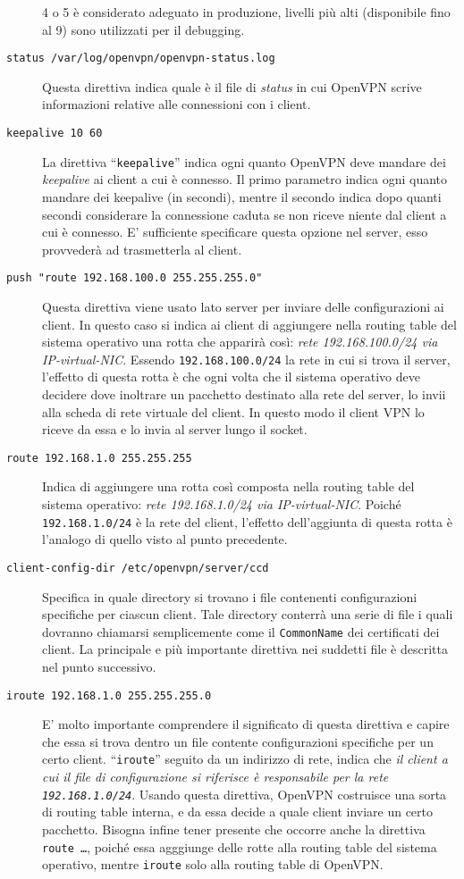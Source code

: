 \begin{description}
  4 o 5 è considerato adeguato in produzione, livelli più alti (disponibile fino al 9)
  sono utilizzati per il debugging.
  \item[\texttt{status /var/log/openvpn/openvpn-status.log}]Questa direttiva indica
  quale è il file di \textit{status} in cui OpenVPN scrive informazioni relative
  alle connessioni con i client.
  \item[\texttt{keepalive 10 60}]La direttiva ``\texttt{keepalive}'' indica ogni
  quanto OpenVPN deve mandare dei \textit{keepalive} ai client a cui è connesso.
  Il primo parametro indica ogni quanto mandare dei keepalive (in secondi), mentre
  il secondo indica dopo quanti secondi considerare la connessione caduta se non riceve
  niente dal client a cui è connesso. E' sufficiente specificare questa opzione
  nel server, esso provvederà ad trasmetterla al client.
  \item[\texttt{push "route 192.168.100.0 255.255.255.0"}]Questa direttiva viene
  usato lato server per inviare delle configurazioni ai client. In questo caso si indica
  ai client di aggiungere nella routing table del sistema operativo una rotta che
  apparirà così: \textit{rete 192.168.100.0/24 via IP-virtual-NIC}. Essendo
  \texttt{192.168.100.0/24} la rete in cui si trova il server, l'effetto di questa
  rotta è che ogni volta che il sistema operativo deve decidere dove inoltrare un
  pacchetto destinato alla rete del server, lo invii alla scheda di rete virtuale
  del client. In questo modo il client VPN lo riceve da essa e lo invia al server
  lungo il socket.
  \item[\texttt{route 192.168.1.0 255.255.255}]Indica di aggiungere una rotta
  così composta nella routing table del sistema operativo: \textit{rete 192.168.1.0/24
  via IP-virtual-NIC}. Poiché \texttt{192.168.1.0/24} è la rete del client, l'effetto
  dell'aggiunta di questa rotta è l'analogo di quello visto al punto precedente.
  \item[\texttt{client-config-dir /etc/openvpn/server/ccd}]Specifica in quale
  directory si trovano i file contenenti configurazioni specifiche per ciascun client.
  Tale directory conterrà una serie di file i quali dovranno chiamarsi semplicemente
  come il \texttt{CommonName} dei certificati dei client. La principale e più
  importante direttiva nei suddetti file è descritta nel punto successivo.
  \item[\texttt{iroute 192.168.1.0 255.255.255.0}]E' molto importante comprendere
  il significato di questa direttiva e capire che essa si trova dentro un file
  contente configurazioni specifiche per un certo client. ``\texttt{iroute}'' seguito
  da un indirizzo di rete, indica che \textit{il client a cui il file di configurazione
  si riferisce è responsabile per la rete \texttt{192.168.1.0/24}}. Usando questa
  direttiva, OpenVPN costruisce una sorta di routing table interna, e da essa
  decide a quale client inviare un certo pacchetto. Bisogna infine tener presente
  che occorre anche la direttiva \texttt{route \ldots}, poiché essa agggiunge delle
  rotte alla routing table del sistema operativo, mentre \texttt{iroute} solo
  alla routing table di OpenVPN.
\end{description}


